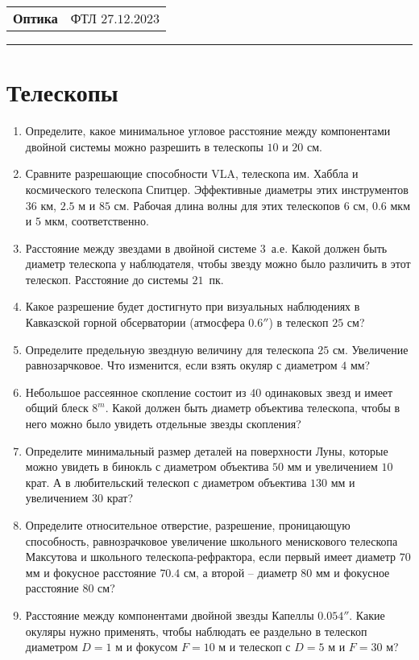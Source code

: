 \documentclass[12pt]{article}
\begin{document}
\begin{tabularx}{\textwidth}{Xr}
{\Large \textbf{Оптика}} & ФТЛ $27.12.2023$ \\
\end{tabularx}
\noindent\rule{\textwidth}{0.4pt}
\section*{Телескопы}
\begin{enumerate}
    \item Определите, какое минимальное угловое расстояние между компонентами двойной системы можно разрешить в телескопы $10$ и $20$ см.
    \item Сравните разрешающие способности VLA, телескопа им. Хаббла и космического телескопа Спитцер. Эффективные диаметры этих инструментов $36$ км, $2.5$ м и $85$ см. Рабочая длина волны для этих телескопов $6$ см, $0.6$ мкм и $5$ мкм, соответственно.
    \item Расстояние между звездами в двойной системе $3$~а.е. Какой должен быть диаметр телескопа у наблюдателя, чтобы звезду можно было различить в этот телескоп. Расстояние до системы $21$~пк.
    \item Какое разрешение будет достигнуто при визуальных наблюдениях в Кавказской горной обсерватории (атмосфера $0.6''$) в телескоп $25$ см?
    \item Определите предельную звездную величину для телескопа $25$ см. Увеличение равнозарчковое. Что изменится, если взять окуляр с диаметром $4$ мм?
    \item Небольшое рассеянное скопление состоит из $40$ одинаковых звезд и имеет общий блеск $8^m$. Какой должен быть диаметр объектива телескопа, чтобы в него можно было увидеть отдельные звезды скопления?
    \item Определите минимальный размер деталей на поверхности Луны, которые можно увидеть в бинокль с диаметром объектива $50$ мм и увеличением $10$ крат. А в любительский телескоп с диаметром объектива $130$ мм и увеличением $30$ крат?
    \item Определите относительное отверстие, разрешение, проницающую способность, равнозрачковое увеличение школьного менискового телескопа Максутова и школьного телескопа-рефрактора, если первый имеет диаметр $70$ мм и фокусное расстояние $70.4$ см, а второй -- диаметр $80$ мм и фокусное расстояние $80$ см?
    \item Расстояние между компонентами двойной звезды Капеллы $0.054''$. Какие окуляры нужно применять, чтобы наблюдать ее раздельно в телескоп диаметром $D = 1$ м и фокусом $F = 10$ м и телескоп с $D = 5$ м и $F = 30$ м?

\end{enumerate}
\end{document}
